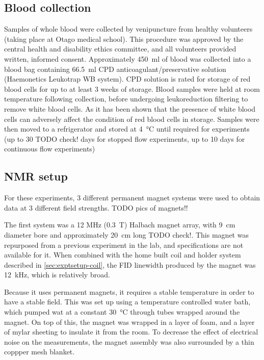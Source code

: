 \subsection{Blood collection}
Samples of whole blood were collected by venipuncture from healthy volunteers (taking place at Otago medical school).
This procedure was approved by the central health and disability ethics committee, and all volunteers provided written, informed consent.
Approximately \SI{450}{ml} of blood was collected into a blood bag containing \SI{66.5}{\milli\litre} CPD anticoagulant/preservative solution (Haemonetics Leukotrap WB system).
CPD solution is rated for storage of red blood cells for up to at least 3 weeks of storage\cite{Hessupdatesolutionsred2006}.
Blood samples were held at room temperature following collection, before undergoing leukoreduction filtering to remove white blood cells.
As it has been shown that the presence of white blood cells can adversely affect the condition of red blood cells in storage\cite{Hessupdatesolutionsred2006}.
Samples were then moved to a refrigerator and stored at \SI{4}{\degreeCelsius} until required for experiments (up to 30 TODO check! days for stopped flow experiments, up to 10 days for continuous flow experiments)

\subsection{NMR setup}
For these experiments, 3 different permanent magnet systems were used to obtain data at 3 different field strengths.
TODO pics of magnets!!

The first system was a 12 MHz (\SI{0.3}{T}) Halbach magnet array, with \SI{9}{cm} diameter bore and approximately \SI{20}{\centi\metre} long TODO check!.
This magnet was repurposed from a previous experiment in the lab, and specifications are not available for it.
When combined with the home built coil and holder system described in \autoref{sec:exptsetup-coil}, the FID linewidth produced by the magnet was \SI{12}{\kilo\hertz}, which is relatively broad.

Because it uses permanent magnets, it requires a stable temperature in order to have a stable field.
This was set up using a temperature controlled water bath, which pumped wat at a constant \SI{30}{\celsius} through tubes wrapped around the magnet.
On top of this, the magnet was wrapped in a layer of foam, and a layer of mylar sheeting to insulate it from the room.
To decrease the effect of electrical noise on the measurements, the magnet assembly was also surrounded by a thin coppper mesh blanket.

